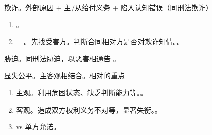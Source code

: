 \begin{enumerate}
\begin{enumerate}
\begin{enumerate}
                        \begin{kk}{欺诈。外部原因 + 主/从给付义务 + 陷入认知错误（同刑法欺诈）}
                          \begin{enumerate}
                            \item {}。
                            \item {} = 。\yi 先找受害方。\er 判断合同相对方是否对欺诈知情。。
                          \end{enumerate}
                        \end{kk}

                        \begin{kk}{胁迫。同刑法胁迫，以恶害相通告}
                          。
                        \end{kk}

                        \begin{kk}{显失公平。主客观相结合。相对的重点}
                          \begin{enumerate}
                            \item 主观。利用危困状态、缺乏判断能力等。。
                            \item 客观。造成双方权利义务不对等，显著失衡。。
                            \item vs 单方允诺。
                          \end{enumerate}
                        \end{kk}


\end{enumerate}
\end{enumerate}
\end{enumerate}
